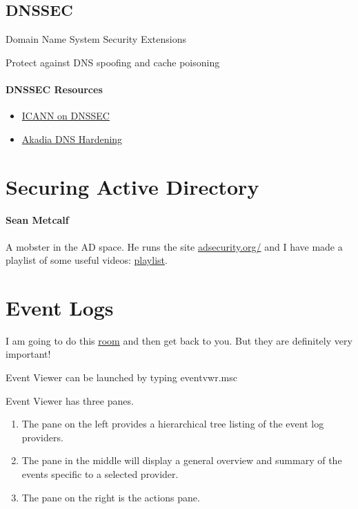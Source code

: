 \documentclass{article}
\begin{document}
\subsection{DNSSEC}
Domain Name System Security Extensions

Protect against DNS spoofing and cache poisoning

\paragraph{DNSSEC Resources}
\begin{itemize}
\item \href{https://www.icann.org/resources/pages/dnssec-what-is-it-why-important-2019-03-05-en}{ICANN on DNSSEC}
\item \href{https://www.akadia.com/services/dns_hardening.html}{Akadia DNS Hardening}
\end{itemize}

\section{Securing Active Directory}

\paragraph{Sean Metcalf}
A mobster in the AD space. He runs the site \href{https://adsecurity.org/}{adsecurity.org/}
and I have made a playlist of some useful videos: \href{https://www.youtube.com/playlist?list=PLHkV-wwoQ7s_7vUau-eqiscWoZZNC3EcZ}{playlist}.

\section{Event Logs}
I am going to do this \href{https://tryhackme.com/room/windowseventlogs}{room} and then get back to you.
But they are definitely very important!

Event Viewer can be launched by typing eventvwr.msc

Event Viewer has three panes.
\begin{enumerate}
\item The pane on the left provides a hierarchical tree listing of the event log providers.
\item The pane in the middle will display a general overview and summary of the events specific to a selected provider.
\item The pane on the right is the actions pane.
\end{enumerate}
\end{document}
